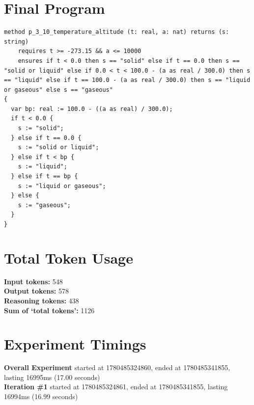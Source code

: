 \documentclass{article}
\begin{document}
\section*{Final Program}
\begin{lstlisting}
method p_3_10_temperature_altitude (t: real, a: nat) returns (s: string)
	requires t >= -273.15 && a <= 10000
	ensures if t < 0.0 then s == "solid" else if t == 0.0 then s == "solid or liquid" else if 0.0 < t < 100.0 - (a as real / 300.0) then s == "liquid" else if t == 100.0 - (a as real / 300.0) then s == "liquid or gaseous" else s == "gaseous"
{
  var bp: real := 100.0 - ((a as real) / 300.0);
  if t < 0.0 {
    s := "solid";
  } else if t == 0.0 {
    s := "solid or liquid";
  } else if t < bp {
    s := "liquid";
  } else if t == bp {
    s := "liquid or gaseous";
  } else {
    s := "gaseous";
  }
}
\end{lstlisting}
\section*{Total Token Usage}
\textbf{Input tokens: }548
\\\textbf{Output tokens: }578
\\\textbf{Reasoning tokens: }438
\\\textbf{Sum of `total tokens': }1126
\section*{Experiment Timings}
\textbf{Overall Experiment} started at 1780485324860, ended at 1780485341855, lasting 16995ms (17.00 seconds)
\\\textbf{Iteration \#1} started at 1780485324861, ended at 1780485341855, lasting 16994ms (16.99 seconds)
\end{document}
